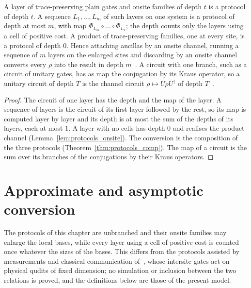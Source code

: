 \begin{theorem}
    \label{thm:protocols_channel_circuits}
    \leanok
    A layer of trace-preserving plain gates and onsite families of depth $t$ is a protocol of
    depth $t$. A sequence $L_1,\dots,L_m$ of such layers on one system is a protocol of depth
    at most $m$, with map $\Phi_{L_m}\circ\dots\circ\Phi_{L_1}$; the depth counts only the
    layers using a cell of positive cost. A product of trace-preserving families, one at every
    site, is a protocol of depth $0$. Hence attaching ancillas by an onsite channel, running a
    sequence of $m$ layers on the enlarged sites and discarding by an onsite channel converts
    every $\rho$ into the result in depth $m$~\cite{Piroli2021LOCC}. A circuit with one branch,
    such as a circuit of unitary gates, has as map the conjugation by its Kraus operator, so a
    unitary circuit of depth $T$ is the channel circuit $\rho\mapsto U\rho U^\dagger$ of depth
    $T$~\cite{Malz2024Preparation}.
\end{theorem}
\begin{proof}\leanok
    The circuit of one layer has the depth and the map of the layer. A sequence of layers is
    the circuit of its first layer followed by the rest, so its map is computed layer by layer
    and its depth is at most the sum of the depths of its layers, each at most $1$. A layer
    with no cells has depth $0$ and realises the product channel
    (Lemma~\ref{lem:protocols_onsite}). The conversion is the composition of the three
    protocols (Theorem~\ref{thm:protocols_comp}). The map of a circuit is the sum over its
    branches of the conjugations by their Kraus operators.
\end{proof}

\section{Approximate and asymptotic conversion}
\label{sec:protocols_approximate}

The protocols of this chapter are unbranched and their onsite families may enlarge the local
bases, while every layer using a cell of positive cost is counted once whatever the sizes of
the bases. This differs from the protocols assisted by measurements and classical
communication of~\cite{Piroli2021LOCC}, whose intersite gates act on physical qudits of fixed
dimension; no simulation or inclusion between the two relations is proved, and the
definitions below are those of the present model.

